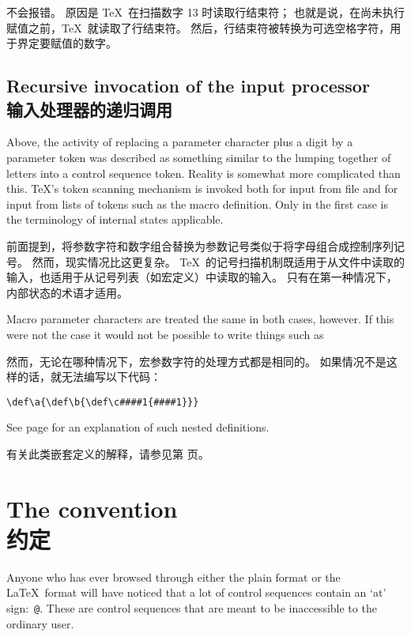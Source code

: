 不会报错。
原因是 \TeX\ 在扫描数字 13 时读取行结束符；
也就是说，在尚未执行赋值之前，\TeX\ 就读取了行结束符。
然后，行结束符被转换为可选空格字符，用于界定要赋值的数字。


\subsection{Recursive invocation of the input processor\\输入处理器的递归调用}

Above, the activity of replacing a parameter
character plus a digit by a parameter token was described
as something similar to the lumping together of letters
into  a control sequence token. Reality is somewhat more
complicated than this. \TeX's token scanning mechanism
is invoked both for input from file and for input from
lists of tokens such as the macro definition. Only in the
first case is the terminology of internal states applicable.

前面提到，将参数字符和数字组合替换为参数记号类似于将字母组合成控制序列记号。
然而，现实情况比这更复杂。 \TeX\ 的记号扫描机制既适用于从文件中读取的输入，也适用于从记号列表（如宏定义）中读取的输入。
只有在第一种情况下，内部状态的术语才适用。

Macro parameter characters are treated the same in both
cases, however. If this were not the case it would
not be possible to write things such as

然而，无论在哪种情况下，宏参数字符的处理方式都是相同的。
如果情况不是这样的话，就无法编写以下代码：
\begin{verbatim}
\def\a{\def\b{\def\c####1{####1}}}
\end{verbatim}
See page \pageref{nest:def} for an explanation of such
nested definitions.

有关此类嵌套定义的解释，请参见第 \pageref{nest:def} 页。


\section{The  convention\\ 约定}

Anyone who has ever browsed through either the plain format or
the \LaTeX\ format will have noticed that a lot of control sequences
contain an `at' sign:~\verb-@-. These are control sequences that
are meant to be inaccessible to the ordinary user.

